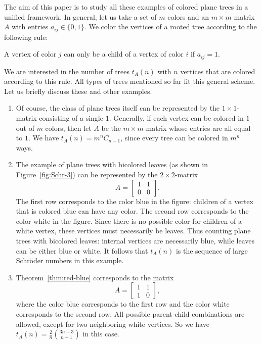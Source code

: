 \documentclass[12pt]{amsart}
\begin{document}
The aim of this paper is to study all these examples of colored plane trees in a unified framework. In general, let us take a set of $m$ colors and an $m \times m$ matrix $A$ with entries $a_{ij} \in \{0,1\}$. We color the vertices of a rooted tree according to the following rule:

\begin{center}
A vertex of color $j$ can only be a child of a vertex of color $i$ if $a_{ij} = 1$.
\end{center}

We are interested in the number of trees $t_A(n)$ with $n$ vertices that are colored according to this rule. All types of trees mentioned so far fit this general scheme. Let us briefly discuss these and other examples.

\begin{enumerate}
\item Of course, the class of plane trees itself can be represented by the $1 \times 1$-matrix consisting of a single $1$. Generally, if each vertex can be colored in $1$ out of $m$ colors, then let $A$ be the $m \times m$-matrix whose entries are all equal to $1$. We have $t_A(n) = m^n C_{n-1}$, since every tree can be colored in $m^n$ ways.
\item The example of plane trees with bicolored leaves (as shown in Figure~\ref{fig:Schr-3}) can be represented by the $2 \times 2$-matrix
$$A = \begin{bmatrix} 1 & 1 \\ 0 & 0 \end{bmatrix}.$$
The first row corresponds to the color blue in the figure: children of a vertex that is colored blue can have any color. The second row corresponds to the color white in the figure. Since there is no possible color for children of a white vertex, these vertices must necessarily be leaves.
Thus counting plane trees with bicolored leaves: internal vertices are necessarily blue, while leaves can be either blue or white. It follows that $t_A(n)$ is the sequence of large Schr\"oder numbers in this example.
\item Theorem~\ref{thm:red-blue} corresponds to the matrix
$$A = \begin{bmatrix} 1 & 1 \\ 1 & 0 \end{bmatrix},$$
where the color blue corresponds to the first row and the color white corresponds to the second row. All possible parent-child combinations are allowed, except for two neighboring white vertices. So we have $t_A(n) = \frac{2}{n} \binom{3n-3}{n-1}$ in this case.

\end{enumerate}
\end{document}
